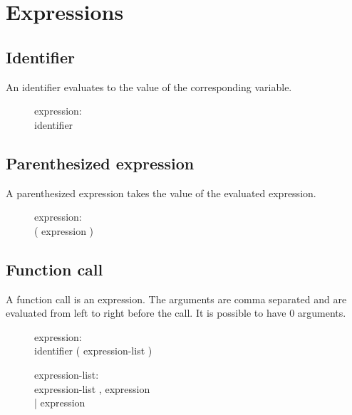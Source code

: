 \section{Expressions}
\subsection{Identifier}
An identifier evaluates to the value of the corresponding variable.
\begin{description}
  \item[]expression: \hfill \\
    identifier
\end{description}

\subsection{Parenthesized expression}
A parenthesized expression takes the value of the evaluated expression.
\begin{description}
  \item[]expression: \hfill \\
    ( expression )
\end{description}

\subsection{Function call}
A function call is an expression. The arguments are comma separated and are evaluated
from left to right before the call. It is possible to have 0 arguments.
\begin{description}
  \item[]expression: \hfill \\
    identifier ( expression-list )
\end{description}

\begin{description}
  \item[]expression-list: \hfill \\
    expression-list , expression \\
    | expression
\end{description}

